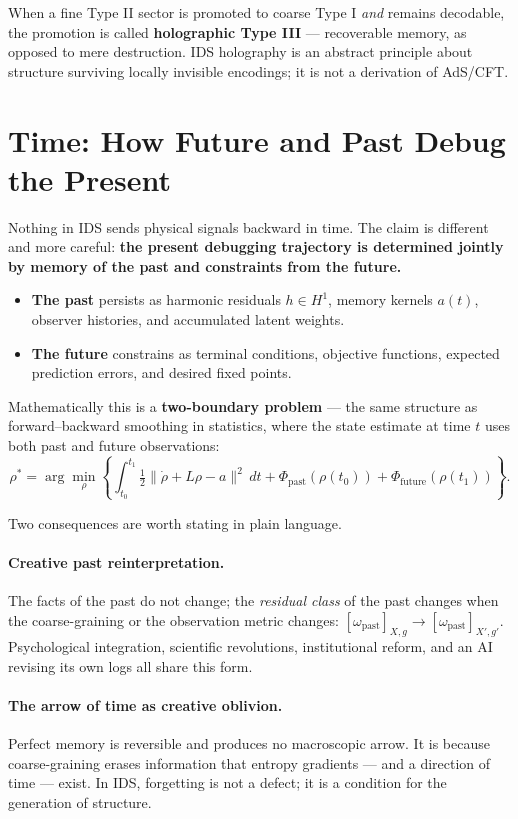 \documentclass[11pt,a4paper]{article}
\theoremstyle{plain}
\begin{document}
When a fine Type II sector is promoted to coarse Type I \emph{and} remains decodable, the promotion is called \textbf{holographic Type III} --- recoverable memory, as opposed to mere destruction. IDS holography is an abstract principle about structure surviving locally invisible encodings; it is not a derivation of AdS/CFT.

\section{Time: How Future and Past Debug the Present}\label{sec:time}

Nothing in IDS sends physical signals backward in time. The claim is different and more careful: \textbf{the present debugging trajectory is determined jointly by memory of the past and constraints from the future.}
\begin{itemize}[itemsep=1pt,topsep=3pt]
\item \textbf{The past} persists as harmonic residuals $h\in H^1$, memory kernels $a(t)$, observer histories, and accumulated latent weights.
\item \textbf{The future} constrains as terminal conditions, objective functions, expected prediction errors, and desired fixed points.
\end{itemize}
Mathematically this is a \textbf{two-boundary problem} --- the same structure as forward--backward smoothing in statistics, where the state estimate at time $t$ uses both past and future observations:
\begin{equation}
\rho^\ast=\arg\min_{\rho}
\left\{
\int_{t_0}^{t_1}\tfrac12\|\dot\rho+L\rho-a\|^2\,dt
+\Phi_{\mathrm{past}}(\rho(t_0))
+\Phi_{\mathrm{future}}(\rho(t_1))
\right\}.
\end{equation}

Two consequences are worth stating in plain language.

\paragraph{Creative past reinterpretation.}
The facts of the past do not change; the \emph{residual class} of the past changes when the coarse-graining or the observation metric changes: $[\omega_{\mathrm{past}}]_{X,g}\to[\omega_{\mathrm{past}}]_{X',g'}$. Psychological integration, scientific revolutions, institutional reform, and an AI revising its own logs all share this form.

\paragraph{The arrow of time as creative oblivion.}
Perfect memory is reversible and produces no macroscopic arrow. It is because coarse-graining erases information that entropy gradients --- and a direction of time --- exist. In IDS, forgetting is not a defect; it is a condition for the generation of structure.
\end{document}
